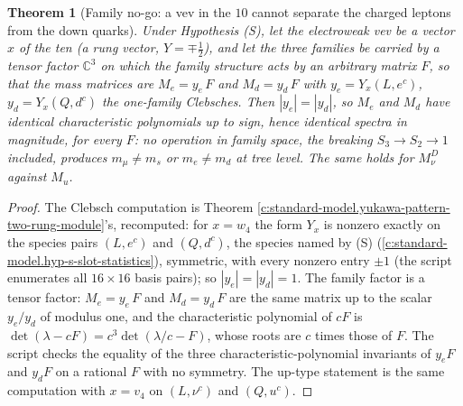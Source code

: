 \documentclass[11pt]{article}
\newtheorem{theorem}{Theorem}[section]
\theoremstyle{definition}
\theoremstyle{plain}
\newcommand{\changedmark}[2]{\marginpar{\raggedright\scriptsize\color{#1}#2}}
\providecommand{\C}{}\renewcommand{\C}{\mathbb{C}}
\begin{document}
\begin{theorem}[Family no-go: a vev in the $10$ cannot separate the charged leptons from the down quarks]\label{c:standard-model.family-no-go-vev-cannot-separate}
\changedmark{gray}{reworded}
Under Hypothesis (S), let the electroweak vev be a vector $x$ of the ten (a rung vector, $Y = \mp\tfrac12$), and let the three families be carried by a tensor factor $\C^{3}$ on which the family structure acts by an arbitrary matrix $F$, so that the mass matrices are $M_{e} = y_{e}\,F$ and $M_{d} = y_{d}\,F$ with $y_{e} = Y_{x}(L, e^{c})$, $y_{d} = Y_{x}(Q, d^{c})$ the one-family Clebsches. Then $|y_{e}| = |y_{d}|$, so $M_{e}$ and $M_{d}$ have identical characteristic polynomials up to sign, hence identical spectra in magnitude, for every $F$: no operation in family space, the breaking $S_{3} \to S_{2} \to 1$ included, produces $m_{\mu} \neq m_{s}$ or $m_{e} \neq m_{d}$ at tree level. The same holds for $M_{\nu}^{D}$ against $M_{u}$.
\end{theorem}
\begin{proof}
The Clebsch computation is Theorem \ref{c:standard-model.yukawa-pattern-two-rung-module}'s, recomputed: for $x = w_{4}$ the form $Y_{x}$ is nonzero exactly on the species pairs $(L, e^{c})$ and $(Q, d^{c})$, the species named by (S) (\ref{c:standard-model.hyp-s-slot-statistics}), symmetric, with every nonzero entry $\pm 1$ (the script enumerates all $16 \times 16$ basis pairs); so $|y_{e}| = |y_{d}| = 1$. The family factor is a tensor factor: $M_{e} = y_{e}\,F$ and $M_{d} = y_{d}\,F$ are the same matrix up to the scalar $y_{e}/y_{d}$ of modulus one, and the characteristic polynomial of $cF$ is $\det(\lambda - cF) = c^{3}\det(\lambda/c - F)$, whose roots are $c$ times those of $F$. The script checks the equality of the three characteristic-polynomial invariants of $y_{e}F$ and $y_{d}F$ on a rational $F$ with no symmetry. The up-type statement is the same computation with $x = v_{4}$ on $(L, \nu^{c})$ and $(Q, u^{c})$.

\end{proof}
\end{document}
